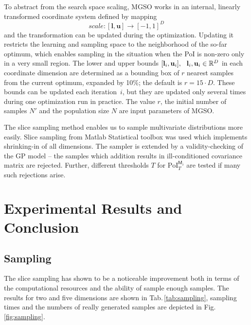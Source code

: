 \documentclass{itatnew}
\begin{document}
To abstract from the search space scaling, MGSO works in an internal, linearly transformed coordinate system defined by mapping
\begin{equation}
\mathit{scale}:[\mathbf{l}, \mathbf{u}] \rightarrow [-1, 1]^D
\end{equation}
and the transformation can be updated during the optimization. Updating it restricts the learning and sampling space to the neighborhood of the so-far optimum, which enables sampling in the situation when the PoI is non-zero only in a very small region. The lower and upper bounds $[\mathbf{l}_i, \mathbf{u}_i], \hspace{0.7em} \mathbf{l}_i,\mathbf{u}_i \in \mathbb{R}^D$ in each coordinate dimension are determined as a bounding box of $r$ nearest samples from the current optimum, expanded by 10\%; the default is $r=15\cdot D$. These bounds can be updated each iteration~$i$, but they are updated only several times during one optimization run in practice. The value $r$, the initial number of samples $N'$ and the population size $N$ are input parameters of MGSO.

The slice sampling method enables us to sample multivariate distributions more easily. Slice sampling from Matlab Statistical toolbox was used which implements shrinking-in of all dimensions. The sampler is extended by a validity-checking of the GP model -- the samples which addition results in ill-con\-di\-tion\-ed covariance matrix are rejected. Further, different thresholds $T$ for $\mathrm{PoI}_T^{\mathsf{M}_i}$ are tested if many such rejections arise.

\section{Experimental Results and Conclusion}
\label{sec:results}

\subsection{Sampling}

The slice sampling has shown to be a noticeable improvement both in terms of the computational resources and the ability of sample enough samples. The results for two and five dimensions are shown in Tab.\,\ref{tab:sampling}, sampling times and the numbers of really generated samples are depicted in Fig.\,\ref{fig:sampling}.
\end{document}
